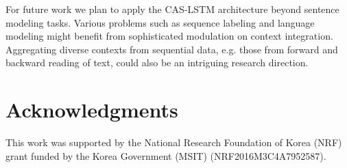 \documentclass[wcp]{jmlr}
\begin{document}
    For future work we plan to apply the CAS-LSTM architecture beyond sentence modeling tasks.
    Various problems such as sequence labeling and language modeling might benefit from sophisticated modulation on context integration.
    Aggregating diverse contexts from sequential data, e.g. those from forward and backward reading of text, could also be an intriguing research direction.
    
    \section*{Acknowledgments}
    This work was supported by the National Research Foundation of Korea (NRF) grant funded by the Korea Government (MSIT) (NRF2016M3C4A7952587).
    
    
\end{document}

